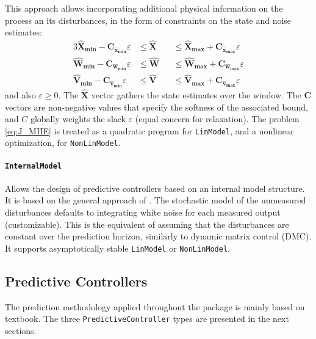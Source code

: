 This approach allows incorporating additional physical information on the process an its disturbances, in the form of constraints on the state and noise estimates:
\begin{alignat}{3}
    \mathbf{\hat{X}_{min} - C_{\hat{x}_{min}}} \varepsilon &\le \mathbf{\hat{X}} &&\le \mathbf{\hat{X}_{max} + C_{\hat{x}_{max}}} \varepsilon \\
    \mathbf{\hat{W}_{min} - C_{\hat{w}_{min}}} \varepsilon &\le \mathbf{\hat{W}} &&\le \mathbf{\hat{W}_{max} + C_{\hat{w}_{max}}} \varepsilon \\
    \mathbf{\hat{V}_{min} - C_{\hat{v}_{min}}} \varepsilon &\le \mathbf{\hat{V}} &&\le \mathbf{\hat{V}_{max} + C_{\hat{v}_{max}}} \varepsilon
\end{alignat}
and also $\varepsilon \ge 0$. The $\mathbf{\hat{X}}$ vector gathers the state estimates over the window. The $\mathbf{C}$ vectors are non-negative values that specify the softness of the associated bound, and $C$ globally weights the slack $\varepsilon$ (equal concern for relaxation). The problem \eqref{eq:J_MHE} is treated as a quadratic program for \texttt{LinModel}, and a nonlinear optimization, for \texttt{NonLinModel}.

\paragraph{\texttt{InternalModel}}
Allows the design of predictive controllers based on an internal model structure. It is based on the general approach of \citet{globPC}. The stochastic model of the unmeasured disturbances defaults to integrating white noise for each measured output (customizable). This is the equivalent of assuming that the disturbances are constant over the prediction horizon, similarly to dynamic matrix control (DMC). It supports asymptotically stable \texttt{LinModel} or \texttt{NonLinModel}.

\subsection{Predictive Controllers}

The prediction methodology applied throughout the package is mainly based on \citet{mpcMac} textbook. The three \texttt{PredictiveController} types are presented in the next sections.

